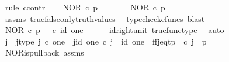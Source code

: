 \begin{isabellebody}
\endisadelimproof
%
\isatagproof
{}\isamarkupfalse%
\ {\isacharparenleft}{\kern0pt}rule\ ccontr{\isacharparenright}{\kern0pt}\isanewline
\ \ \isamarkupfalse%
\ {\isachardoublequoteopen}NOR\ {\isasymcirc}\isactrlsub c\ {\isasymlangle}p{\isacharcomma}{\kern0pt}{\isasymt}{\isasymrangle}\ {\isasymnoteq}\ {\isasymf}{\isachardoublequoteclose}\isanewline
\ \ \isamarkupfalse%
\ \isamarkupfalse%
\ {\isachardoublequoteopen}NOR\ {\isasymcirc}\isactrlsub c\ {\isasymlangle}p{\isacharcomma}{\kern0pt}{\isasymt}{\isasymrangle}\ {\isacharequal}{\kern0pt}\ {\isasymt}{\isachardoublequoteclose}\isanewline
\ \ \ \ \isamarkupfalse%
\ assms\ true{\isacharunderscore}{\kern0pt}false{\isacharunderscore}{\kern0pt}only{\isacharunderscore}{\kern0pt}truth{\isacharunderscore}{\kern0pt}values\ \isamarkupfalse%
\ {\isacharparenleft}{\kern0pt}typecheck{\isacharunderscore}{\kern0pt}cfuncs{\isacharcomma}{\kern0pt}\ blast{\isacharparenright}{\kern0pt}\isanewline
\ \ \isamarkupfalse%
\ \isamarkupfalse%
\ {\isachardoublequoteopen}NOR\ {\isasymcirc}\isactrlsub c\ {\isasymlangle}p{\isacharcomma}{\kern0pt}{\isasymt}{\isasymrangle}\ {\isacharequal}{\kern0pt}\ {\isasymt}\ {\isasymcirc}\isactrlsub c\ id\ one{\isachardoublequoteclose}\isanewline
\ \ \ \ \isamarkupfalse%
\ id{\isacharunderscore}{\kern0pt}right{\isacharunderscore}{\kern0pt}unit{}\ true{\isacharunderscore}{\kern0pt}func{\isacharunderscore}{\kern0pt}type\ \isamarkupfalse%
\ auto\isanewline
\ \ \isamarkupfalse%
\ \isamarkupfalse%
\ j\ \ j{\isacharunderscore}{\kern0pt}type{\isacharcolon}{\kern0pt}\ {\isachardoublequoteopen}j\ {\isasymin}\isactrlsub c\ one{\isachardoublequoteclose}\ \ j{\isacharunderscore}{\kern0pt}id{\isacharcolon}{\kern0pt}\ {\isachardoublequoteopen}{\isasymbeta}\isactrlbsub one\isactrlesub \ {\isasymcirc}\isactrlsub c\ j\ {\isacharequal}{\kern0pt}\ id\ one{\isachardoublequoteclose}\ \ ff{\isacharunderscore}{\kern0pt}j{\isacharunderscore}{\kern0pt}eq{\isacharunderscore}{\kern0pt}tp{\isacharcolon}{\kern0pt}\ {\isachardoublequoteopen}{\isasymlangle}{\isasymf}{\isacharcomma}{\kern0pt}{\isasymf}{\isasymrangle}\ {\isasymcirc}\isactrlsub c\ j\ {\isacharequal}{\kern0pt}\ {\isasymlangle}p{\isacharcomma}{\kern0pt}{\isasymt}{\isasymrangle}{\isachardoublequoteclose}\isanewline
\ \ \ \ \isamarkupfalse%
\ NOR{\isacharunderscore}{\kern0pt}is{\isacharunderscore}{\kern0pt}pullback\ assms\ \isamarkupfalse%

\end{isabellebody}
